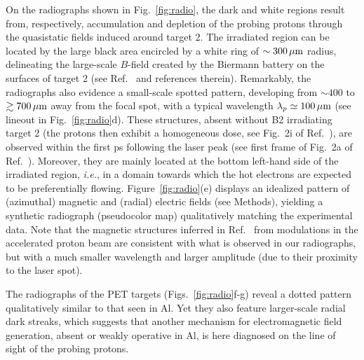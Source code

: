 \documentclass[aps,twocolumn,showpacs,superscriptaddress]{revtex4}
\begin{document}
On the radiographs shown in Fig.~\ref{fig:radio}, the dark and white regions result from, respectively, accumulation and depletion of the probing protons through the quasistatic fields induced around target 2. The irradiated region can be located by the large black area encircled by a white ring of $\sim 300\,\rm \mu m$ radius, delineating the large-scale $B$-field created by the Biermann battery on the surfaces of target 2 (see Ref.~\cite{RSI_Albertazzi_2015} and references therein). 
Remarkably, the radiographs also evidence a small-scale spotted pattern, developing from $\sim 400$ to $\gtrsim 700\,\rm \mu m$ away from the focal spot, with a typical wavelength  $\lambda_p \simeq 100\,\rm \mu m$ (see lineout in Fig.~\ref{fig:radio}d).
These structures, absent without B2 irradiating target 2 (the protons then exhibit a homogeneous dose, see Fig.~2i of Ref.~\cite{RSI_Albertazzi_2015}), are observed within the first ps following the laser peak (see first frame of Fig.~2a of Ref.~\cite{RSI_Albertazzi_2015}).
Moreover, they are mainly located at the bottom left-hand side of the irradiated region, \emph{i.e.}, in a domain towards which the hot electrons are expected to be preferentially flowing. Figure~\ref{fig:radio}(e) displays an idealized pattern of (azimuthal) magnetic and (radial) electric fields (see Methods), yielding a synthetic radiograph (pseudocolor map) qualitatively matching the experimental data. Note that the magnetic structures inferred in Ref.~\cite{PRL_Gode_2017} from modulations in the accelerated proton beam are consistent with what is observed in our radiographs, but with a much smaller wavelength and larger amplitude (due to their proximity to the laser spot).

The radiographs of the PET targets (Figs.~\ref{fig:radio}f-g) reveal a dotted pattern qualitatively similar to that seen in Al. Yet they also
feature larger-scale radial dark streaks, which suggests that another mechanism for electromagnetic field generation, absent or weakly operative in Al, is here diagnosed on the line of sight of the probing protons.
\end{document}
